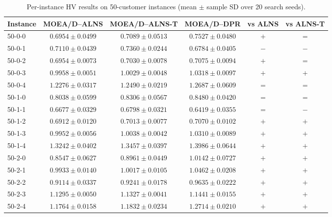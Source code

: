 \begin{table}[t]
\centering
\caption{Per-instance HV results on 50-customer instances (mean $\pm$ sample SD over 20 search seeds).}
\begin{tabular}{lccccc}
\toprule
Instance & MOEA/D--ALNS & MOEA/D--ALNS-T & MOEA/D--DPR & vs ALNS & vs ALNS-T \\
\midrule
50-0-0 & $0.6954 \pm 0.0499$ & $0.7089 \pm 0.0513$ & $\mathbf{0.7527 \pm 0.0480}$ & $+$ & $=$ \\
50-0-1 & $0.7110 \pm 0.0439$ & $\mathbf{0.7360 \pm 0.0244}$ & $0.6784 \pm 0.0405$ & $-$ & $-$ \\
50-0-2 & $0.6954 \pm 0.0073$ & $0.7030 \pm 0.0078$ & $\mathbf{0.7075 \pm 0.0094}$ & $+$ & $=$ \\
50-0-3 & $0.9958 \pm 0.0051$ & $1.0029 \pm 0.0048$ & $\mathbf{1.0318 \pm 0.0097}$ & $+$ & $+$ \\
50-0-4 & $1.2276 \pm 0.0317$ & $1.2490 \pm 0.0219$ & $\mathbf{1.2687 \pm 0.0609}$ & $=$ & $=$ \\
50-1-0 & $0.8038 \pm 0.0599$ & $0.8306 \pm 0.0567$ & $\mathbf{0.8480 \pm 0.0420}$ & $=$ & $=$ \\
50-1-1 & $0.6677 \pm 0.0329$ & $\mathbf{0.6798 \pm 0.0321}$ & $0.6419 \pm 0.0355$ & $=$ & $-$ \\
50-1-2 & $0.6912 \pm 0.0120$ & $0.7013 \pm 0.0077$ & $\mathbf{0.7070 \pm 0.0102}$ & $+$ & $+$ \\
50-1-3 & $0.9952 \pm 0.0056$ & $1.0038 \pm 0.0042$ & $\mathbf{1.0310 \pm 0.0089}$ & $+$ & $+$ \\
50-1-4 & $1.3242 \pm 0.0402$ & $1.3457 \pm 0.0397$ & $\mathbf{1.3986 \pm 0.0644}$ & $+$ & $+$ \\
50-2-0 & $0.8547 \pm 0.0627$ & $0.8961 \pm 0.0449$ & $\mathbf{1.0142 \pm 0.0727}$ & $+$ & $+$ \\
50-2-1 & $0.9933 \pm 0.0140$ & $1.0017 \pm 0.0105$ & $\mathbf{1.0462 \pm 0.0208}$ & $+$ & $+$ \\
50-2-2 & $0.9114 \pm 0.0337$ & $0.9241 \pm 0.0178$ & $\mathbf{0.9635 \pm 0.0222}$ & $+$ & $+$ \\
50-2-3 & $1.1295 \pm 0.0050$ & $1.1327 \pm 0.0041$ & $\mathbf{1.1441 \pm 0.0155}$ & $+$ & $+$ \\
50-2-4 & $1.1764 \pm 0.0158$ & $1.1832 \pm 0.0234$ & $\mathbf{1.2714 \pm 0.0210}$ & $+$ & $+$ \\
\bottomrule
\end{tabular}
\end{table}

